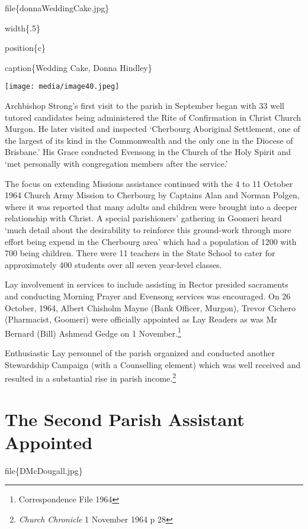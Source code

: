 file\{donnaWeddingCake.jpg\}

width\{.5\}

position\{c\}

caption\{Wedding Cake, Donna Hindley\}

\texttt{[image: media/image40.jpeg]}

Archbishop Strong's first visit to the parish in September began with 33 well tutored candidates being administered the Rite of Confirmation in Christ Church Murgon. He later visited and inspected `Cherbourg Aboriginal Settlement, one of the largest of its kind in the Commonwealth and the only one in the Diocese of Brisbane.' His Grace conducted Evensong in the Church of the Holy Spirit and `met personally with congregation members after the service.'

The focus on extending Missions assistance continued with the 4 to 11 October 1964 Church Army Mission to Cherbourg by Captains Alan and Norman Polgen, where it was reported that many adults and children were brought into a deeper relationship with Christ. A special parishioners' gathering in Goomeri heard `much detail about the desirability to reinforce this ground-work through more effort being expend in the Cherbourg area' which had a population of 1200 with 700 being children. There were 11 teachers in the State School to cater for approximately 400 students over all seven year-level classes.

Lay involvement in services to include assisting in Rector presided sacraments and conducting Morning Prayer and Evensong services was encouraged. On 26 October, 1964, Albert Chisholm Mayne (Bank Officer, Murgon), Trevor Cichero (Pharmacist, Goomeri) were officially appointed as Lay Readers as was Mr Bernard (Bill) Ashmead Gedge on 1 November.\footnote{Correspondence File 1964}

Enthusiastic Lay personnel of the parish organized and conducted another Stewardship Campaign (with a Counselling element) which was well received and resulted in a substantial rise in parish income.\footnote{\emph{Church Chronicle} 1 November 1964 p 28}

\hypertarget{the-second-parish-assistant-appointed}{%
\section{The Second Parish Assistant Appointed}\label{the-second-parish-assistant-appointed}}

file\{DMcDougall.jpg\}


